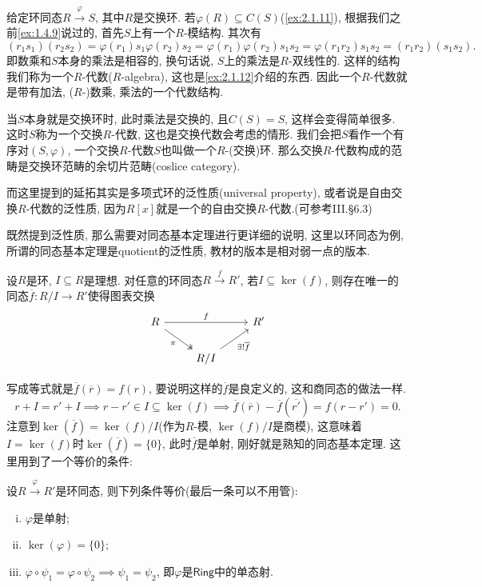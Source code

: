 \begin{remark}
    给定环同态$R \overset{\varphi}\to S$, 其中$R$是交换环. 若$\varphi(R) \subseteq C(S)$(\ref{ex:2.1.11}), 根据我们之前\ref{ex:1.4.9}说过的, 首先$S$上有一个$R$-模结构. 其次有
    \[
        (r_1s_1)(r_2s_2) = \varphi(r_1)s_1\varphi(r_2)s_2 = \varphi(r_1)\varphi(r_2)s_1s_2 = \varphi(r_1r_2)s_1s_2 = (r_1r_2)(s_1s_2).
    \]
    即数乘和$S$本身的乘法是相容的, 换句话说, $S$上的乘法是$R$-双线性的. 这样的结构我们称为一个$R$-代数($R$-algebra), 这也是\ref{ex:2.1.12}介绍的东西. 因此一个$R$-代数就是带有加法, ($R$-)数乘, 乘法的一个代数结构.
    
    当$S$本身就是交换环时, 此时乘法是交换的, 且$C(S) = S$, 这样会变得简单很多. 这时$S$称为一个交换$R$-代数, 这也是交换代数会考虑的情形. 我们会把$S$看作一个有序对$(S, \varphi)$, 一个交换$R$-代数$S$也叫做一个$R$-(交换)环. 那么交换$R$-代数构成的范畴是交换环范畴的余切片范畴(coslice category).
    
    而这里提到的延拓其实是多项式环的泛性质(universal property), 或者说是自由交换$R$-代数的泛性质, 因为$R[x]$就是一个的自由交换$R$-代数.(可参考\cite{aluffi2009algebra}III.\S6.3)

    既然提到泛性质, 那么需要对同态基本定理进行更详细的说明, 这里以环同态为例, 所谓的同态基本定理是quotient的泛性质, 教材的版本是相对弱一点的版本.

    \begin{thmstar}
        设$R$是环, $I \subseteq R$是理想. 对任意的环同态$R \stackrel{f}{\to} R'$, 若$I \subseteq \ker(f)$, 则存在唯一的同态$\overline{f}:R/I \to R'$使得图表交换
        \[
            \begin{tikzcd}
                R \arrow[rr, "f"] \arrow[rd, "\pi"', two heads] &                                 & R' \\
                                                                & R/I \arrow[ru, "\exists!\overline{f}"'] &   
                \end{tikzcd}
        \]
    \end{thmstar}
    写成等式就是$\overline{f}(\overline{r}) = f(r)$, 要说明这样的$\overline{f}$是良定义的, 这和商同态的做法一样.
    \[
        r + I = r' + I \implies r - r' \in I \subseteq \ker(f) \implies \overline{f}(\overline{r}) - \overline{f}(\overline{r'}) = f(r - r') = 0.
    \]
    注意到$\ker(\overline{f}) = \ker(f)/I$(作为$R$-模, $\ker(f)/I$是商模), 这意味着$I = \ker(f)$时$\ker(\overline{f}) = \{0\}$, 此时$\overline{f}$是单射, 刚好就是熟知的同态基本定理. 这里用到了一个等价的条件:

    \begin{propstar}
        设$R \xrightarrow{\varphi} R'$是环同态, 则下列条件等价(最后一条可以不用管):
        \begin{enumerate}[(i)]
            \item $\varphi$是单射;
            \item $\ker(\varphi) = \{0\}$;
            \item $\varphi \circ \psi_1 = \varphi \circ \psi_2 \implies \psi_1 = \psi_2$, 即$\varphi$是$\mathsf{Ring}$中的单态射.
        \end{enumerate}
    \end{propstar}
    

\end{remark}
